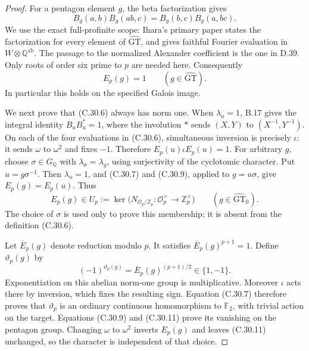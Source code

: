 \begin{proof}
For a pentagon element $g$, the beta factorization gives
\[
 B_g(a,b)B_g(ab,c)=B_g(b,c)B_g(a,bc).
 \tag{C.30.8}
\]
We use the exact full-profinite scope: Ihara's primary paper
\cite[introduction, p.~1; \S2, display (6), preprint p.~9]{DE_Ihara2000}
states the factorization for every element of
$\widehat{\mathrm{GT}}$, and gives faithful Fourier evaluation in
$W\otimes\mathbb Q^{\mathrm{ab}}$. The passage to the normalized
Alexander coefficient is the one in D.39. Only roots of order six
prime to $p$ are needed here. Consequently
\[
               E_p(g)=1\qquad(g\in\widehat{\mathrm{GT}}).
 \tag{C.30.9}
\]
In particular this holds on the specified Galois image.

We next prove that (C.30.6) always has norm one. When $\lambda_u=1$,
B.17 gives the integral identity $B_uB_u^*=1$, where the involution
$*$ sends $(X,Y)$ to $(X^{-1},Y^{-1})$. On each of the four evaluations
in (C.30.6), simultaneous inversion is precisely $\iota$: it sends
$\omega$ to $\omega^2$ and fixes $-1$. Therefore
$E_p(u)\iota E_p(u)=1$.
For arbitrary $g$, choose $\sigma\in G_{\mathbb Q}$ with
$\lambda_\sigma=\lambda_g$, using surjectivity of the cyclotomic
character. Put $u=g\sigma^{-1}$. Then $\lambda_u=1$, and (C.30.7)
and (C.30.9), applied to $g=u\sigma$, give $E_p(g)=E_p(u)$.
Thus
\[
 E_p(g)\in U_p:=\ker\bigl(
       N_{\mathcal O_p/\mathbb Z_p}:\mathcal O_p^\times
                       \longrightarrow\mathbb Z_p^\times\bigr)
                 \qquad(g\in\widehat{\mathrm{GT}}_0).
 \tag{C.30.10}
\]
The choice of $\sigma$ is used only to prove this membership; it is
absent from the definition (C.30.6).

Let $\overline E_p(g)$ denote reduction modulo $p$. It satisfies
$\overline E_p(g)^{p+1}=1$. Define $\vartheta_p(g)$ by
\[
       (-1)^{\vartheta_p(g)}
            =\overline E_p(g)^{(p+1)/2}\in\{1,-1\}.
 \tag{C.30.11}
\]
Exponentiation on this abelian norm-one group is multiplicative.
Moreover $\iota$ acts there by inversion, which fixes the resulting
sign. Equation (C.30.7) therefore proves that $\vartheta_p$ is an
ordinary continuous homomorphism to $\mathbb F_2$, with trivial
action on the target. Equations (C.30.9) and (C.30.11) prove its
vanishing on the pentagon group. Changing $\omega$ to $\omega^2$
inverts $E_p(g)$ and leaves (C.30.11) unchanged, so the character
is independent of that choice.


\end{proof}
